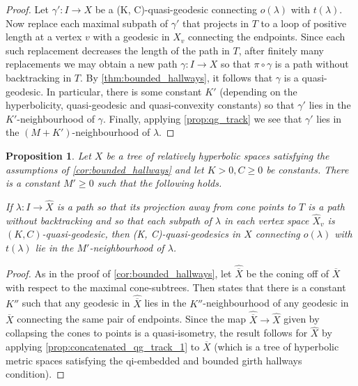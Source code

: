 \documentclass[11pt, a4paper]{amsart}
\newtheorem{proposition}[theorem]{Proposition}
\theoremstyle{definition}
\newcommand{\wh}[1]{\widehat{ #1 }}
\begin{document}
\begin{proof}
Let $\gamma'\colon I\to X$ be a (K, C)-quasi-geodesic connecting $o(\lambda)$ with $t(\lambda)$. Now replace each maximal subpath of $\gamma'$ that projects in $T$ to a loop of positive length at a vertex $v$ with a geodesic in $X_v$ connecting the endpoints. Since each such replacement decreases the length of the path in $T$, after finitely many replacements we may obtain a new path $\gamma\colon I\to X$ so that $\pi\circ\gamma$ is a path without backtracking in $T$. By \cref{thm:bounded_hallways}, it follows that $\gamma$ is a quasi-geodesic. In particular, there is some constant $K'$ (depending on the hyperbolicity, quasi-geodesic and quasi-convexity constants) so that $\gamma'$ lies in the $K'$-neighbourhood of $\gamma$. Finally, applying \cref{prop:qg_track} we see that $\gamma'$ lies in the $(M + K')$-neighbourhood of $\lambda$.
\end{proof}





\begin{proposition}
\label{prop:concatenated_qg_track_2}
Let $X$ be a tree of relatively hyperbolic spaces satisfying the assumptions of \cref{cor:bounded_hallways} and let $K> 0, C\geqslant 0$ be constants. There is a constant $M'\geqslant 0$ such that the following holds.

If $\lambda \colon I \to \wh{X}$ is a path so that its projection away from cone points to $T$ is a path without backtracking and so that each subpath of $\lambda$ in each vertex space $\wh{X}_v$ is $(K, C)$-quasi-geodesic, then (K, C)-quasi-geodesics in $X$ connecting $o(\lambda)$ with $t(\lambda)$ lie in the $M'$-neighbourhood of $\lambda$.
\end{proposition}


\begin{proof}
As in the proof of \cref{cor:bounded_hallways}, let $\wh{\overline{X}}$ be the coning off of $\overline{X}$ with respect to the maximal cone-subtrees. Then \cite[Lemma 2.4]{MR08} states that there is a constant $K''$ such that any geodesic in $\wh{\overline{X}}$ lies in the $K''$-neighbourhood of any geodesic in $\overline{X}$ connecting the same pair of endpoints. Since the map $\wh{\overline{X}}\to \wh{X}$ given by collapsing the cones to points is a quasi-isometry, the result follows for $\wh{X}$ by applying \cref{prop:concatenated_qg_track_1} to $\overline{X}$ (which is a tree of hyperbolic metric spaces satisfying the qi-embedded and bounded girth hallways condition).
\end{proof}
\end{document}
